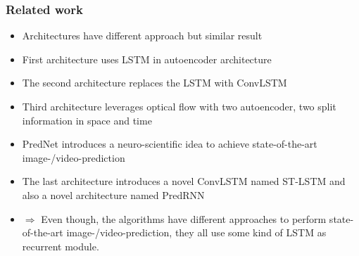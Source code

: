  \begin{frame}
  \frametitle{Related work}
  
  \begin{itemize}
   \item<1-> Architectures have different approach but similar result
   \item<2-> First architecture uses LSTM in autoencoder architecture
   \item<3-> The second architecture replaces the LSTM with ConvLSTM
   \item<4-> Third architecture leverages optical flow with two autoencoder, two split information in space and time
   \item<5-> PredNet introduces a neuro-scientific idea to achieve state-of-the-art image-/video-prediction
   \item<6-> The last architecture introduces a novel ConvLSTM named ST-LSTM and also a novel architecture named PredRNN
   \item<7-> $\Rightarrow$ Even though, the algorithms have different approaches to perform state-of-the-art image-/video-prediction, they all use some kind
   of LSTM as recurrent module.
  \end{itemize}
 \end{frame}
